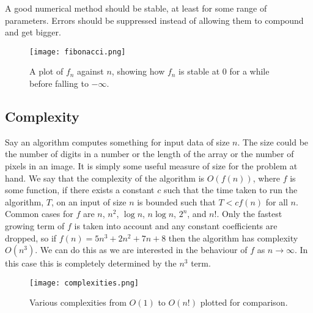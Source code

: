 \documentclass[a4paper]{article}
\begin{document}
    A good numerical method should be stable, at least for some range of parameters.
    Errors should be suppressed instead of allowing them to compound and get bigger.
    
    \begin{figure}[ht]
        \centering
        \texttt{[image: fibonacci.png]}
        \caption{A plot of \(f_n\) against \(n\), showing how \(f_n\) is stable at 0 for a while before falling to \(-\infty\).}
    \end{figure}
    
    \subsection{Complexity}
    Say an algorithm computes something for input data of size \(n\).
    The size could be the number of digits in a number or the length of the array or the number of pixels in an image.
    It is simply some useful measure of size for the problem at hand.
    We say that the complexity of the algorithm is \(O(f(n))\), where \(f\) is some function, if there exists a constant \(c\) such that the time taken to run the algorithm, \(T\), on an input of size \(n\) is bounded such that \(T < cf(n)\) for all \(n\).
    Common cases for \(f\) are \(n\), \(n^2\), \(\log n\), \(n\log n\), \(2^n\), and \(n!\).
    Only the fastest growing term of \(f\) is taken into account and any constant coefficients are dropped, so if \(f(n) = 5n^3 + 2n^2 + 7n + 8\) then the algorithm has complexity \(O(n^3)\).
    We can do this as we are interested in the behaviour of \(f\) as \(n \to \infty\).
    In this case this is completely determined by the \(n^3\) term.
    
    \begin{figure}[ht]
        \centering
        \texttt{[image: complexities.png]}
        \caption{Various complexities from \(O(1)\) to \(O(n!)\) plotted for comparison.}
    \end{figure}
    
\end{document}
